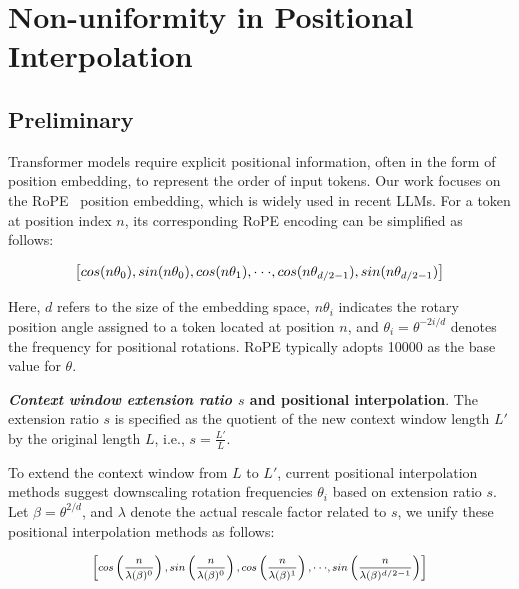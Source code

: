 \section{Non-uniformity in Positional Interpolation}
\label{sec:analysis}

\subsection{Preliminary}

Transformer models require explicit positional information, often in the form of position embedding, to represent the order of input tokens. Our work focuses on the RoPE~\cite{rope} position embedding, which is widely used in recent  LLMs. For a token at position index $n$, its corresponding RoPE encoding can be simplified as follows:

\begin{equation}
		\fontsize{7.8}{7.8} \selectfont
	\label{eq:rope}
	\left[ cos(n\theta_0), sin(n\theta_0), cos(n\theta_1), \cdot\cdot\cdot, cos(n\theta_{d/2-1}), sin(n\theta_{d/2-1}) \right]   
\end{equation}

Here, $d$ refers to the size of the embedding space, $n\theta_i$ indicates the rotary position angle assigned to a token located at position $n$, and $\theta_i=\theta^{-2i/d}$ denotes the frequency for positional rotations. RoPE typically adopts 10000 as the base value for $\theta$.

\textbf{\emph{Context window extension ratio $s$} and positional interpolation}. The extension ratio $s$ is specified as the quotient of the new context window length $L'$ by the original length $L$, i.e., $s=\frac{L'}{L}$.

To extend the context window from $L$ to $L'$, current positional interpolation methods suggest downscaling rotation frequencies $\theta_i$ based on extension ratio $s$. Let $\beta=\theta^{2/d}$, and $\lambda$ denote the actual rescale factor related to $s$, we   unify these positional interpolation methods as follows:

\begin{equation}	
	\fontsize{7.5}{7.5} \selectfont
	\label{eq:unified_rope}
	\begin{aligned}
		\left[cos\left(\frac{n}{\lambda(\beta)^0}\right), sin \left(\frac{n}{\lambda(\beta)^0}\right), cos\left(\frac{n}{\lambda(\beta)^1}\right), \cdot\cdot\cdot,  sin \left(\frac{n}{\lambda(\beta)^{d/2-1}}\right) \right]   
	\end{aligned}
\end{equation}

